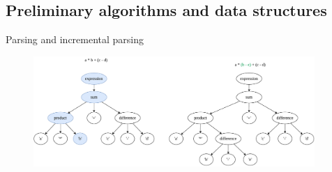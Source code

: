 \documentclass[aspectratio=1610, xcolor=table]{beamer}
\begin{document}
\subsection{Preliminary algorithms and data structures}
\begin{frame}{Parsing and incremental parsing}
    \begin{figure}
        \begin{center}
            \includegraphics[width=0.95\textwidth]{figures/incrementalparsing.drawio.pdf}
        \end{center}
    \end{figure}
\end{frame}
\end{document}
